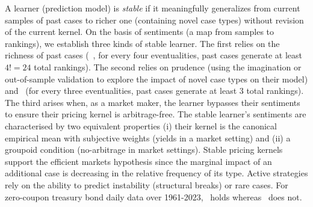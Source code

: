 %
%
%
%
%
%
%
%
%
%
A learner (prediction model) is \emph{stable} if it meaningfully generalizes
from current samples of past cases to richer one (containing novel case types)
without revision of the current kernel.
On the basis of sentiments (a map from samples to rankings), we establish three
kinds of stable learner.  The first relies on the richness of past cases (\eg\
\fourdiv, for every four eventualities, past cases generate at least $4!=24$
total rankings).  The second relies on prudence (using the imagination or
out-of-sample validation to explore the impact of novel case types on their
model) and \parthreediv\ (for every three eventualities, past cases generate at
least $3$ total rankings). The third arises when, as a market maker, the
learner bypasses their sentiments to ensure their pricing kernel is
arbitrage-free.  The stable learner's sentiments are characterised by two
equivalent properties (i) their kernel is the canonical empirical mean with
subjective weights (yields in a market setting) and (ii) a groupoid condition
(no-arbitrage in market settings).  Stable pricing kernels support the
efficient markets hypothesis since the marginal impact of an additional case is
decreasing in the relative frequency of its type.  Active strategies rely on
the ability to predict instability (structural breaks) or rare cases.  For
zero-coupon treasury bond daily data over 1961-2023, \parthreediv\ holds
whereas \fourdiv\ does not.


